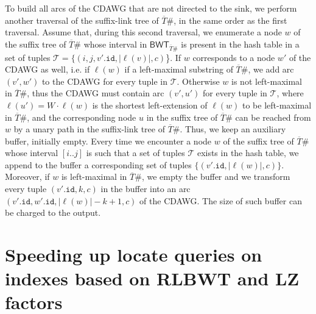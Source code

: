 \documentclass[a4paper,UKenglish]{lipics-v2016}
\newcommand{\REV}[1]{\ensuremath{\overline{#1}}}
\newcommand{\BWT}{\ensuremath{\mathsf{BWT}}}
\begin{document}
To build all arcs of the CDAWG that are not directed to the sink, we perform another traversal of the suffix-link tree of $\REV{T}\#$, in the same order as the first traversal. Assume that, during this second traversal, we enumerate a node $w$ of the suffix tree of $\REV{T}\#$ whose interval in $\BWT_{\REV{T}\#}$ is present in the hash table in a set of tuples $\mathcal{T}=\{(i,j,v'.\mathtt{id},|\ell(v)|,c)$\}. If $w$ corresponds to a node $w'$ of the CDAWG as well, i.e. if $\ell(w)$ if a left-maximal substring of $\REV{T}\#$, we add arc $(v',w')$ to the CDAWG for every tuple in $\mathcal{T}$. Otherwise $w$ is not left-maximal in $\REV{T}\#$, thus the CDAWG must contain arc $(v',u')$ for every tuple in $\mathcal{T}$, where $\ell(u') = W \cdot \ell(w)$ is the shortest left-extension of $\ell(w)$ to be left-maximal in $\REV{T}\#$, and the corresponding node $u$ in the suffix tree of $\REV{T}\#$ can be reached from $w$ by a unary path in the suffix-link tree of $\REV{T}\#$. Thus, we keep an auxiliary buffer, initially empty. Every time we encounter a node $w$ of the suffix tree of $\REV{T}\#$ whose interval $[i..j]$ is such that a set of tuples $\mathcal{T}$ exists in the hash table, we append to the buffer a corresponding set of tuples $\{(v'.\mathtt{id},|\ell(w)|,c)\}$. Moreover, if $w$ is left-maximal in $\REV{T}\#$, we empty the buffer and we transform every tuple $(v'.\mathtt{id},k,c)$ in the buffer into an arc $(v'.\mathtt{id},w'.\mathtt{id},|\ell(w)|-k+1,c)$ of the CDAWG. The size of such buffer can be charged to the output.











\section{Speeding up locate queries on indexes based on RLBWT and LZ factors} \label{sec:heuristics}
\end{document}
